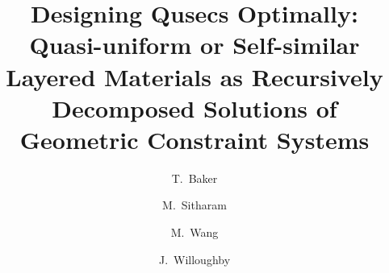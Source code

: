 \documentclass[3p]{elsarticle}
\begin{document}
\begin{frontmatter}
%
%
\title{Designing Qusecs Optimally: Quasi-uniform or Self-similar Layered Materials as Recursively Decomposed Solutions of Geometric Constraint Systems}

%
%

%
%


\author[uf]{T.~Baker}

\author[uf]{M.~Sitharam}

\author[uf]{M.~Wang}

\author[uf]{J.~Willoughby}


\address[uf]{University of Florida, CSE Building, Gainesville, Florida, U.S.A., 32611}


%
%











%
%



\end{frontmatter}
\end{document}
